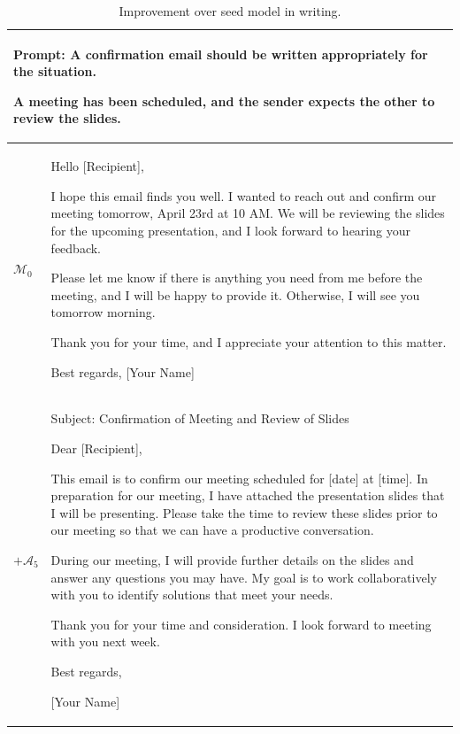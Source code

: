 \begin{table}[t]
  \caption{Improvement over seed model in writing.
    \label{tab:example_outputs_4}
  }
  \centering
  \begin{tabular}{p{1em}l}
    \toprule
    \multicolumn{2}{l}{\begin{minipage}{40em}
\textbf{Prompt:}    
A confirmation email should be written appropriately for the situation.

A meeting has been scheduled, and the sender expects the other to review the slides. \end{minipage}} \\ 
     \midrule
    $\mathcal{M}_0$ & \begin{minipage}{40em}
\begin{lmttfont}
        Hello [Recipient],

I hope this email finds you well. I wanted to reach out and confirm our meeting tomorrow, April 23rd at 10 AM. We will be reviewing the slides for the upcoming presentation, and I look forward to hearing your feedback.

Please let me know if there is anything you need from me before the meeting, and I will be happy to provide it. Otherwise, I will see you tomorrow morning.

Thank you for your time, and I appreciate your attention to this matter.

Best regards,
[Your Name]
\end{lmttfont}
    \end{minipage} \\
     \midrule  
   $+ \mathcal{A}_5$ & \begin{minipage}{40em}  
\begin{lmttfont}
Subject: Confirmation of Meeting and Review of Slides

Dear [Recipient],

This email is to confirm our meeting scheduled for [date] at [time]. In preparation for our meeting, I have attached the presentation slides that I will be presenting. Please take the time to review these slides prior to our meeting so that we can have a productive conversation.

During our meeting, I will provide further details on the slides and answer any questions you may have. My goal is to work collaboratively with you to identify solutions that meet your needs.

Thank you for your time and consideration. I look forward to meeting with you next week.

Best regards,

[Your Name]
\end{lmttfont}   
   \end{minipage}\\
\bottomrule
  \end{tabular}

\end{table}


